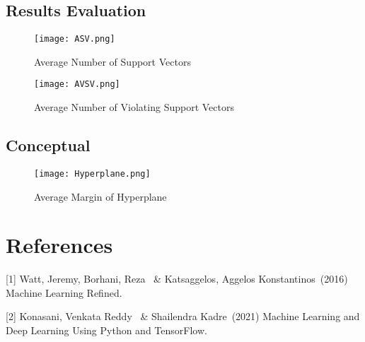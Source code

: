 \documentclass{article}
\begin{document}
\subsection{Results Evaluation}
\begin{figure}[!ht]
    \centering
    \texttt{[image: ASV.png]}
    \caption{Average Number of Support Vectors}
\end{figure}

\begin{figure}[!ht]
    \centering
    \texttt{[image: AVSV.png]}
    \caption{Average Number of Violating Support Vectors}
\end{figure}

\clearpage
\subsection{Conceptual}
\begin{figure}[!ht]
    \centering
    \texttt{[image: Hyperplane.png]}
    \caption{Average Margin of Hyperplane}
\end{figure}

\section*{References}
{
\small
[1] Watt, Jeremy, Borhani, Reza \ \& Katsaggelos, Aggelos Konstantinos\ (2016) Machine Learning Refined.

[2] Konasani, Venkata Reddy \ \& Shailendra Kadre\ (2021) Machine Learning and Deep Learning Using Python and TensorFlow.
}
\end{document}
